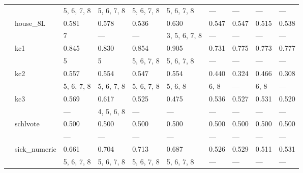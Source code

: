\documentclass{article}
\begin{document}
\begin{center}
\begin{longtable}{p{1.2cm}p{1.8cm}p{1cm}p{1cm}p{1cm}p{1cm}p{1cm}p{1cm}p{1cm}p{1cm}}
             &              & 5, 6, 7, 8       & 5, 6, 7, 8    & 5, 6, 7, 8    & 5, 6, 7, 8    & ---           & ---        & ---              & ---           \\
             & house\_8L     & 0.581            & 0.578         & 0.536         & 0.630         & 0.547         & 0.547      & 0.515            & 0.538         \\
             &              & 7                & ---           & ---           & 3, 5, 6, 7, 8 & ---           & ---        & ---              & ---           \\
             & kc1          & 0.845            & 0.830         & 0.854         & 0.905         & 0.731         & 0.775      & 0.773            & 0.777         \\
             &              & 5                & 5             & 5, 6, 7, 8    & 5, 6, 7, 8    & ---           & ---        & ---              & ---           \\
             & kc2          & 0.557            & 0.554         & 0.547         & 0.554         & 0.440         & 0.324      & 0.466            & 0.308         \\
             &              & 5, 6, 7, 8       & 5, 6, 7, 8    & 5, 6, 7, 8    & 5, 6, 8       & 6, 8          & ---        & 6, 8             & ---           \\
             & kc3          & 0.569            & 0.617         & 0.525         & 0.475         & 0.536         & 0.527      & 0.531            & 0.520         \\
             &              & ---              & 4, 5, 6, 8    & ---           & ---           & ---           & ---        & ---              & ---           \\
             & schlvote     & 0.500            & 0.500         & 0.500         & 0.500         & 0.500         & 0.500      & 0.500            & 0.500         \\
             &              & ---              & ---           & ---           & ---           & ---           & ---        & ---              & ---           \\
             & sick\_numeric & 0.661            & 0.704         & 0.713         & 0.687         & 0.526         & 0.529      & 0.511            & 0.531         \\
             &              & 5, 6, 7, 8       & 5, 6, 7, 8    & 5, 6, 7, 8    & 5, 6, 7, 8    & ---           & ---        & ---              & ---           \\

\end{longtable}
\end{center}
\end{document}
